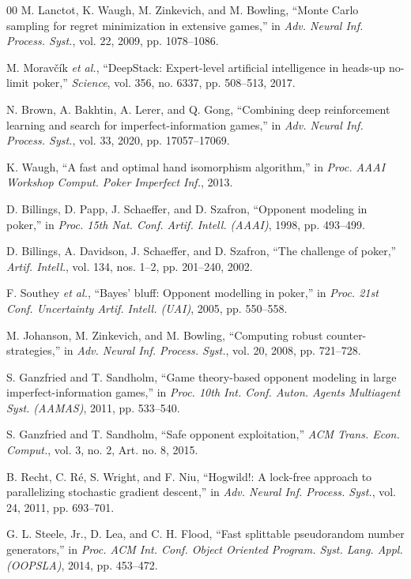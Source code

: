 \documentclass{ieeeaccess}
\begin{document}
\begin{thebibliography}{00}
 M. Lanctot, K. Waugh, M. Zinkevich, and M. Bowling, ``Monte Carlo sampling
for regret minimization in extensive games,'' in \emph{Adv. Neural Inf. Process. Syst.}, vol. 22,
2009, pp. 1078--1086.

 M. Morav\v{c}\'{i}k \emph{et al.}, ``DeepStack: Expert-level artificial
intelligence in heads-up no-limit poker,'' \emph{Science}, vol. 356, no. 6337, pp. 508--513,
2017.

 N. Brown, A. Bakhtin, A. Lerer, and Q. Gong, ``Combining deep reinforcement
learning and search for imperfect-information games,'' in \emph{Adv. Neural Inf. Process. Syst.},
vol. 33, 2020, pp. 17057--17069.

 K. Waugh, ``A fast and optimal hand isomorphism algorithm,'' in \emph{Proc.
AAAI Workshop Comput. Poker Imperfect Inf.}, 2013.

 D. Billings, D. Papp, J. Schaeffer, and D. Szafron, ``Opponent modeling
in poker,'' in \emph{Proc. 15th Nat. Conf. Artif. Intell. (AAAI)}, 1998, pp. 493--499.

 D. Billings, A. Davidson, J. Schaeffer, and D. Szafron, ``The challenge
of poker,'' \emph{Artif. Intell.}, vol. 134, nos. 1--2, pp. 201--240, 2002.

 F. Southey \emph{et al.}, ``Bayes' bluff: Opponent modelling in poker,''
in \emph{Proc. 21st Conf. Uncertainty Artif. Intell. (UAI)}, 2005, pp. 550--558.

 M. Johanson, M. Zinkevich, and M. Bowling, ``Computing robust
counter-strategies,'' in \emph{Adv. Neural Inf. Process. Syst.}, vol. 20, 2008, pp. 721--728.

 S. Ganzfried and T. Sandholm, ``Game theory-based opponent modeling in
large imperfect-information games,'' in \emph{Proc. 10th Int. Conf. Auton. Agents Multiagent
Syst. (AAMAS)}, 2011, pp. 533--540.

 S. Ganzfried and T. Sandholm, ``Safe opponent exploitation,'' \emph{ACM
Trans. Econ. Comput.}, vol. 3, no. 2, Art. no. 8, 2015.

 B. Recht, C. R\'{e}, S. Wright, and F. Niu, ``Hogwild!: A lock-free approach
to parallelizing stochastic gradient descent,'' in \emph{Adv. Neural Inf. Process. Syst.},
vol. 24, 2011, pp. 693--701.

 G. L. Steele, Jr., D. Lea, and C. H. Flood, ``Fast splittable pseudorandom
number generators,'' in \emph{Proc. ACM Int. Conf. Object Oriented Program. Syst. Lang. Appl.
(OOPSLA)}, 2014, pp. 453--472.

\end{thebibliography}
\end{document}
